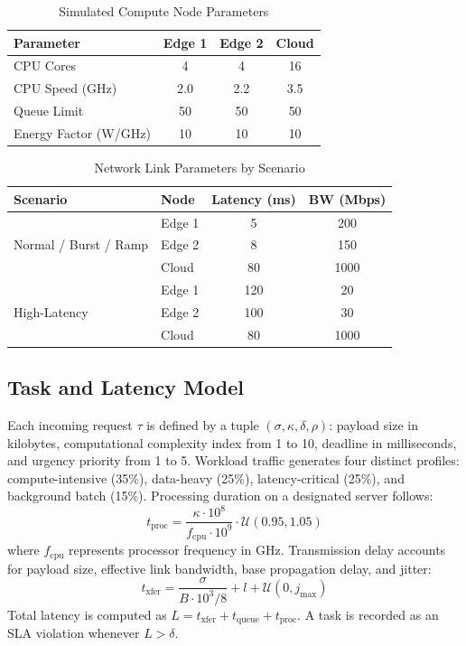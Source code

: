 \documentclass[conference]{IEEEtran}
\begin{document}
\begin{table}[h]
\centering
\caption{Simulated Compute Node Parameters}
\label{tab:nodes}
\begin{tabular}{lccc}
\toprule
\textbf{Parameter} & \textbf{Edge 1} & \textbf{Edge 2} & \textbf{Cloud} \\
\midrule
CPU Cores       & 4    & 4    & 16   \\
CPU Speed (GHz) & 2.0  & 2.2  & 3.5  \\
Queue Limit     & 50   & 50   & 50   \\
Energy Factor (W/GHz) & 10 & 10 & 10 \\
\bottomrule
\end{tabular}
\end{table}

\begin{table}[h]
\centering
\caption{Network Link Parameters by Scenario}
\label{tab:network}
\begin{tabular}{llcc}
\toprule
\textbf{Scenario} & \textbf{Node} & \textbf{Latency (ms)} & \textbf{BW (Mbps)} \\
\midrule
\multirow{3}{*}{Normal / Burst / Ramp}
  & Edge 1 & 5   & 200  \\
  & Edge 2 & 8   & 150  \\
  & Cloud  & 80  & 1000 \\
\midrule
\multirow{3}{*}{High-Latency}
  & Edge 1 & 120 & 20   \\
  & Edge 2 & 100 & 30   \\
  & Cloud  & 80  & 1000 \\
\bottomrule
\end{tabular}
\end{table}

\subsection{Task and Latency Model}
Each incoming request $\tau$ is defined by a tuple $(\sigma, \kappa, \delta, \rho)$: payload size in kilobytes, computational complexity index from 1 to 10, deadline in milliseconds, and urgency priority from 1 to 5. Workload traffic generates four distinct profiles: compute-intensive (35\%), data-heavy (25\%), latency-critical (25\%), and background batch (15\%). Processing duration on a designated server follows:
\begin{equation}
  t_{\mathrm{proc}} =
  \frac{\kappa \cdot 10^8}{f_{\mathrm{cpu}} \cdot 10^9}
  \cdot \mathcal{U}(0.95, 1.05)
  \label{eq:proc}
\end{equation}
where $f_{\mathrm{cpu}}$ represents processor frequency in GHz. Transmission delay accounts for payload size, effective link bandwidth, base propagation delay, and jitter:
\begin{equation}
  t_{\mathrm{xfer}} =
  \frac{\sigma}{B \cdot 10^3 / 8} + l + \mathcal{U}(0, j_{\max})
  \label{eq:xfer}
\end{equation}
Total latency is computed as $L = t_{\mathrm{xfer}} + t_{\mathrm{queue}} + t_{\mathrm{proc}}$. A task is recorded as an SLA violation whenever $L > \delta$.
\end{document}
